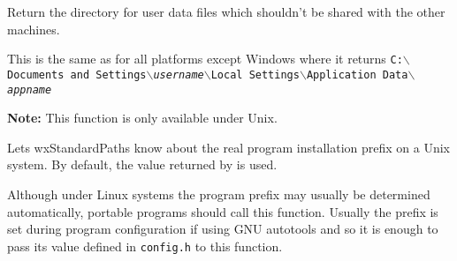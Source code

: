 \label{wxstandardpathsgetuserlocaldatadir}


Return the directory for user data files which shouldn't be shared with
the other machines.

This is the same as  for
all platforms except Windows where it returns
\texttt{C:$\backslash$Documents and Settings$\backslash$\textit{username}$\backslash$Local Settings$\backslash$Application Data$\backslash$\textit{appname}}


\label{wxstandardpathssetinstallprefix}


\textbf{Note:} This function is only available under Unix.

Lets wxStandardPaths know about the real program installation prefix on a Unix
system. By default, the value returned by
 is used.

Although under Linux systems the program prefix may usually be determined
automatically, portable programs should call this function. Usually the prefix
is set during program configuration if using GNU autotools and so it is enough
to pass its value defined in \texttt{config.h} to this function.

